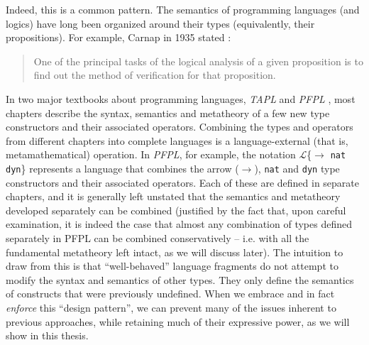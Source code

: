 Indeed, this is a common pattern. The semantics of programming languages (and logics) have long been organized around their types (equivalently, their propositions). %
For example, Carnap in 1935 stated \cite{carnap35}:
\begin{quote}
One of the principal tasks of the logical analysis of a given proposition is to find out the method of verification for that proposition.
\end{quote}
In two major textbooks about programming languages, \emph{TAPL} \cite{tapl} and \emph{PFPL} \cite{pfpl}, most chapters describe the syntax, semantics and metatheory of a few new type constructors and their associated  operators. Combining the types and operators from different chapters into complete languages is a language-external (that is, metamathematical) operation. In \emph{PFPL}, for example,  the notation $\mathcal{L}$\{$\rightarrow$ \verb|nat| \verb|dyn|\} represents a language that combines the arrow ($\rightarrow$), \verb|nat| and \verb|dyn| type constructors and their associated operators. Each of these are defined in separate chapters, and it is generally left unstated that the semantics and metatheory developed separately can be combined (justified by the fact that, upon careful examination, it is indeed the case that almost any combination of types defined separately in PFPL can be combined conservatively -- i.e. with all the fundamental metatheory left intact, as we will discuss later). %
The intuition to draw from this is that ``well-behaved'' language fragments do not attempt to modify the syntax and  semantics of other types. They only define the semantics of constructs that were previously undefined. When we embrace and in fact \emph{enforce} this ``design pattern'', we can prevent many of the issues inherent to previous approaches, while retaining much of their expressive power, as we will show in this thesis. %

